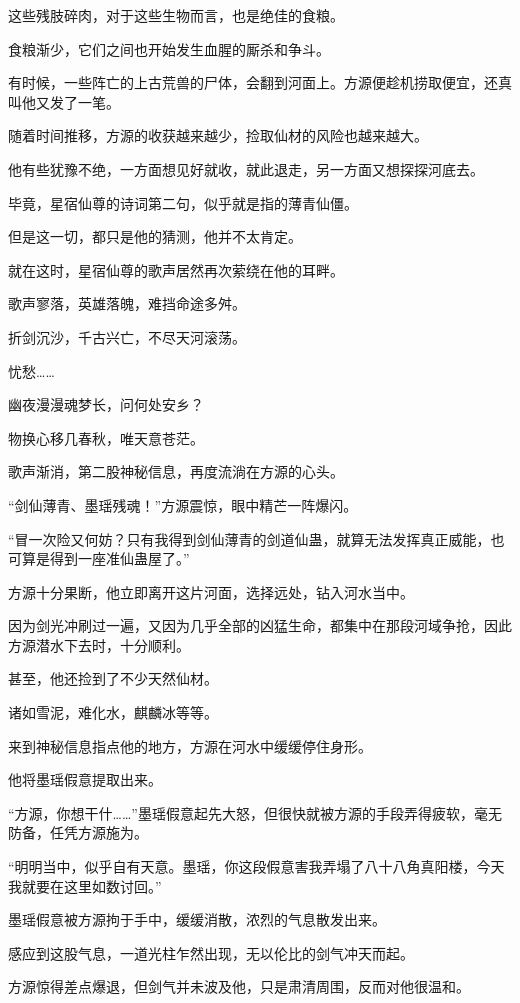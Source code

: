 \begin{this_body}
这些残肢碎肉，对于这些生物而言，也是绝佳的食粮。

食粮渐少，它们之间也开始发生血腥的厮杀和争斗。

有时候，一些阵亡的上古荒兽的尸体，会翻到河面上。方源便趁机捞取便宜，还真叫他又发了一笔。

随着时间推移，方源的收获越来越少，捡取仙材的风险也越来越大。

他有些犹豫不绝，一方面想见好就收，就此退走，另一方面又想探探河底去。

毕竟，星宿仙尊的诗词第二句，似乎就是指的薄青仙僵。

但是这一切，都只是他的猜测，他并不太肯定。

就在这时，星宿仙尊的歌声居然再次萦绕在他的耳畔。

歌声寥落，英雄落魄，难挡命途多舛。

折剑沉沙，千古兴亡，不尽天河滚荡。

忧愁……

幽夜漫漫魂梦长，问何处安乡？

物换心移几春秋，唯天意苍茫。

歌声渐消，第二股神秘信息，再度流淌在方源的心头。

“剑仙薄青、墨瑶残魂！”方源震惊，眼中精芒一阵爆闪。

“冒一次险又何妨？只有我得到剑仙薄青的剑道仙蛊，就算无法发挥真正威能，也可算是得到一座准仙蛊屋了。”

方源十分果断，他立即离开这片河面，选择远处，钻入河水当中。

因为剑光冲刷过一遍，又因为几乎全部的凶猛生命，都集中在那段河域争抢，因此方源潜水下去时，十分顺利。

甚至，他还捡到了不少天然仙材。

诸如雪泥，难化水，麒麟冰等等。

来到神秘信息指点他的地方，方源在河水中缓缓停住身形。

他将墨瑶假意提取出来。

“方源，你想干什……”墨瑶假意起先大怒，但很快就被方源的手段弄得疲软，毫无防备，任凭方源施为。

“明明当中，似乎自有天意。墨瑶，你这段假意害我弄塌了八十八角真阳楼，今天我就要在这里如数讨回。”

墨瑶假意被方源拘于手中，缓缓消散，浓烈的气息散发出来。

感应到这股气息，一道光柱乍然出现，无以伦比的剑气冲天而起。

方源惊得差点爆退，但剑气并未波及他，只是肃清周围，反而对他很温和。


\end{this_body}
